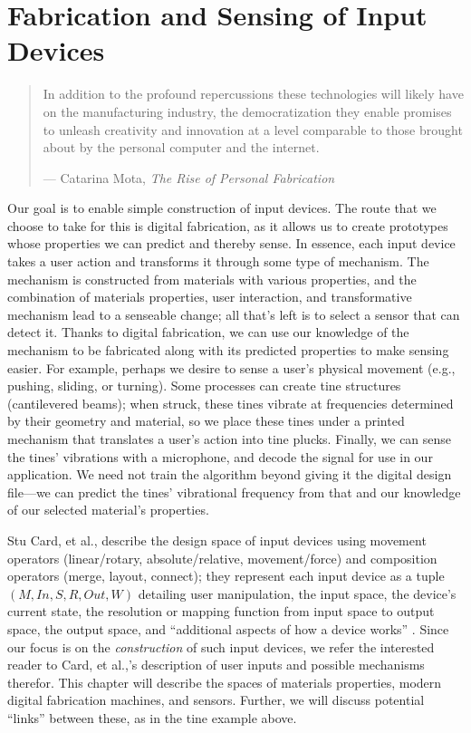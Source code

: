 \chapter{Fabrication and Sensing of Input Devices}


\begin{quote}
In addition to the profound repercussions these technologies
will likely have on the manufacturing industry, the
democratization they enable promises to unleash creativity
and innovation at a level comparable to those brought about
by the personal computer and the internet.

--- Catarina Mota, \emph{The Rise of Personal Fabrication}
\end{quote}

Our goal is to enable simple construction of input devices. The route that we choose to take for this is digital fabrication, as it allows us to create prototypes whose properties we can predict and thereby sense. In essence, each input device takes a user action and transforms it through some type of mechanism. The mechanism is constructed from materials with various properties, and the combination of materials properties, user interaction, and transformative mechanism lead to a senseable change; all that's left is to select a sensor that can detect it. Thanks to digital fabrication, we can use our knowledge of the mechanism to be fabricated along with its predicted properties to make sensing easier.  For example, perhaps we desire to sense a user's physical movement (e.g., pushing, sliding, or turning). Some processes can create tine structures (cantilevered beams); when struck, these tines vibrate at frequencies determined by their geometry and material, so we place these tines under a printed mechanism that translates a user's action into tine plucks. Finally, we can sense the tines' vibrations with a microphone, and decode the signal for use in our application. We need not train the algorithm beyond giving it the digital design file---we can predict the tines' vibrational frequency from that and our knowledge of our selected material's properties.

Stu Card, et al., describe the design space of input devices using movement operators (linear/rotary, absolute/relative, movement/force) and composition operators (merge, layout, connect); they represent each input device as a tuple $(M, In, S, R, Out, W)$ detailing user manipulation, the input space, the device's current state, the resolution or mapping function from input space to output space, the output space, and ``additional aspects of how a device works'' \cite{card-input}. Since our focus is on the \emph{construction} of such input devices, we refer the interested reader to Card, et al.,'s description of user inputs and possible mechanisms therefor. This chapter will describe the spaces of materials properties, modern digital fabrication machines, and sensors. Further, we will discuss potential ``links'' between these, as in the tine example above.

